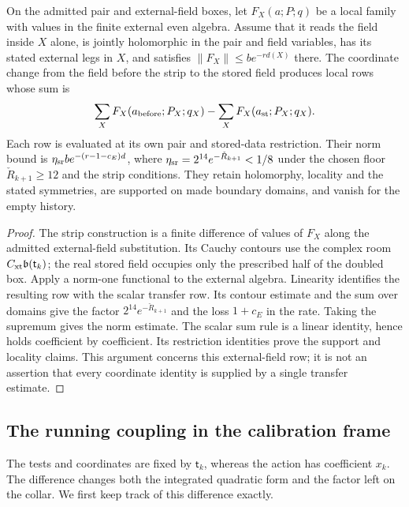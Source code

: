 \documentclass[11pt,letterpaper,reqno]{amsart}
\makeatletter
\theoremstyle{definition}
\newcommand{\ms@minorstart}{%
  \pushQED{\qed}\renewcommand{\qedsymbol}{$\blacksquare$}}
\newenvironment{lemma}[1][]{\ms@minorstart\ms@lemma[#1]}
  {\popQED\endms@lemma}
\theoremstyle{remark}
\makeatother
\begin{document}
\begin{lemma}[Moving an external field to its stored value]
\label{C-399-42}
On the admitted pair and external-field boxes, let
$F_X(a;P;q)$ be a local family with values in the finite
external even algebra. Assume that it reads the field inside
$X$ alone, is jointly holomorphic in the pair and field
variables, has its stated external legs in $X$, and satisfies
$\|F_X\|\le b e^{-r d(X)}$ there. The coordinate change from
the field before the strip to the stored field produces local
rows whose sum is
\[
 \sum_X F_X(a_{\rm before};P_X;q_X)
       -\sum_X F_X(a_{\rm st};P_X;q_X).
\]
Each row is evaluated at its own pair and stored-data
restriction. Their norm bound is
$\eta_{\rm sr}b e^{-(r-1-c_E)d}$, where
$\eta_{\rm sr}=2^{14}e^{-\check R_{k+1}}<1/8$ under the
chosen floor $\check R_{k+1}\ge12$ and the strip conditions.
They retain holomorphy, locality and the stated symmetries,
are supported on made boundary domains, and vanish for the
empty history.
\end{lemma}
\begin{proof}
The strip construction is a finite difference of values of
$F_X$ along the admitted external-field substitution. Its
Cauchy contours use the complex room
$C_{\rm xt}\mathfrak b(\mathsf t_k)$; the real stored field
occupies only the prescribed half of the doubled box.
Apply a norm-one functional to the external algebra.
Linearity identifies the resulting row with the scalar
transfer row. Its contour estimate and the sum over
domains give the factor $2^{14}e^{-\check R_{k+1}}$ and
the loss $1+c_E$ in the rate. Taking the supremum gives
the norm estimate. The scalar sum rule is a linear
identity, hence holds coefficient by coefficient. Its
restriction identities prove the support and locality
claims. This argument concerns this external-field row;
it is not an assertion that every coordinate identity is
supplied by a single transfer estimate.
\end{proof}

\subsection{The running coupling in the calibration frame}

The tests and coordinates are fixed by $\mathsf t_k$, whereas
the action has coefficient $x_k$. The difference changes
both the integrated quadratic form and the factor left on
the collar. We first keep track of this difference exactly.
\end{document}
